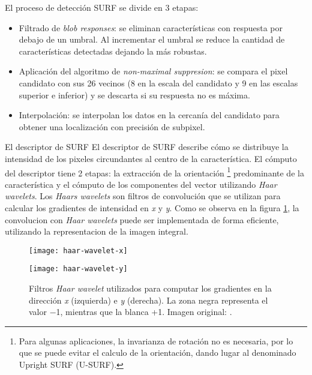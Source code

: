\begin{subsection}
\begin{subsection}
El proceso de detección SURF se divide en 3 etapas:
\begin{itemize}
\item Filtrado de \textit{blob responses}: se eliminan características con respuesta por debajo de un umbral. Al incrementar el umbral se reduce la cantidad de características detectadas dejando la más robustas. 

\item Aplicación del algoritmo de \textit{non-maximal suppresion}: se compara el pixel candidato con sus 26 vecinos (8 en la escala del candidato y 9 en las escalas superior e inferior) y se descarta si su respuesta no es máxima.

\item Interpolación: se interpolan los datos en la cercanía del candidato para obtener una localización con precisión de subpixel.

\end{itemize}
\end{subsection}

\begin{subsection} 
{El descriptor de SURF}
El descriptor de SURF describe cómo se distribuye la intensidad de los pixeles circundantes al centro de la característica. El cómputo del descriptor tiene 2 etapas: la extracción de la orientación
\footnote{Para algunas aplicaciones, la invarianza de rotación no es necesaria, por lo que se puede evitar el calculo de la orientación, dando lugar al denominado Upright SURF (U-SURF).}
predominante de la característica y el cómputo de los componentes del vector utilizando \textit{Haar wavelets}. Los \textit{Haars wavelets} son filtros de convolución que se utilizan para calcular los gradientes de intensidad en \textit{x} y \textit{y}. Como se observa en la figura \ref{fig:haar-wavelet}, la convolucion con \textit{Haar wavelets} puede ser implementada de forma eficiente, utilizando la representacion de la imagen integral.

\begin{figure}[ht]
\centering
\begin{minipage}[h]{.45\textwidth}
\begin{center}
\texttt{[image: haar-wavelet-x]}
\end{center}
\end{minipage}
\hfill
\begin{minipage}[h]{.45\textwidth}
\begin{center}
\texttt{[image: haar-wavelet-y]}
\end{center}
\end{minipage}
\hfill
\caption[Haar wavelet]{Filtros \textit{Haar wavelet} utilizados para computar los gradientes en la dirección \textit{x} (izquierda) e \textit{y} (derecha). La zona negra representa el valor −1, mientras que la blanca +1. Imagen original: \cite{bay2008speeded}.}
\label{fig:haar-wavelet}
\end{figure}


\end{subsection}
\end{subsection}
